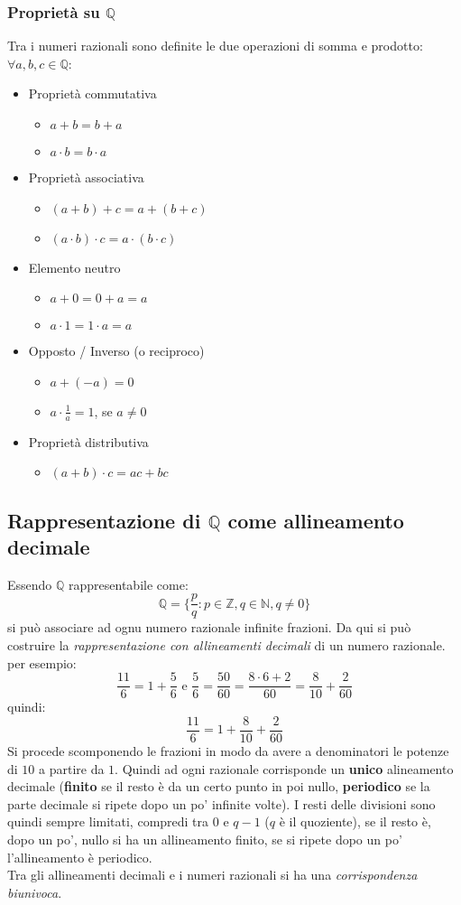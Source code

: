 \documentclass[a4paper,12pt, oneside]{book}
\begin{document}
\subsubsection{Proprietà su $\mathbb{Q}$}
Tra i numeri razionali sono definite le due operazioni di somma e prodotto:\\
$\forall a,b,c\in\mathbb{Q}$:
\begin{itemize}
	\item Proprietà commutativa
		\begin{itemize}
			\item $a+b=b+a$
			\item $a \cdot b=b \cdot a$
		\end{itemize}
	\item Proprietà associativa
		\begin{itemize}
			\item $(a+b)+c=a+(b+c)$
			\item $(a\cdot b)\cdot c=a\cdot(b\cdot c)$
		\end{itemize}
	\item Elemento neutro
		\begin{itemize}
			\item $a+0=0+a=a$
			\item $a\cdot 1=1\cdot a=a$
		\end{itemize}
	\item Opposto / Inverso (o reciproco)
		\begin{itemize}
			\item $a+(-a)=0$
			\item $a\cdot\frac1{a}=1$, se $a\neq0$
		\end{itemize}
	\item Proprietà distributiva
		\begin{itemize}
			\item $(a+b)\cdot c=ac+bc$
		\end{itemize}
\end{itemize}
\subsection{Rappresentazione di $\mathbb{Q}$ come allineamento decimale}
Essendo $\mathbb{Q}$ rappresentabile come:
$$\mathbb{Q} = \{\frac{p}{q} : p\in\mathbb{Z}, q\in\mathbb{N}, q \neq 0 \}$$ si può associare ad ognu numero razionale infinite frazioni. Da qui si può costruire la \textit{rappresentazione con allineamenti decimali} di un numero razionale. per esempio:
$$\frac{11}{6}=1+\frac{5}{6} \mbox{ e } \frac{5}{6}=\frac{50}{60}=\frac{8\cdot 6+2}{60}=\frac{8}{10}+\frac{2}{60}$$
quindi: $$\frac{11}{6}=1+\frac{8}{10}+\frac{2}{60}$$
Si procede scomponendo le frazioni in modo da avere a denominatori le potenze di $10$ a partire da $1$. Quindi ad ogni razionale corrisponde un \textbf{unico} alineamento decimale (\textbf{finito} se il resto è da un certo punto in poi nullo, \textbf{periodico} se la parte decimale si ripete dopo un po' infinite volte). I resti delle divisioni sono quindi sempre limitati, compredi tra $0$ e $q-1$ ($q$ è il quoziente), se il resto è, dopo un po', nullo si ha un allineamento finito, se si ripete dopo un po' l'allineamento è periodico.\\Tra gli allineamenti decimali e i numeri razionali si ha una \textit{corrispondenza biunivoca}.
\end{document}
